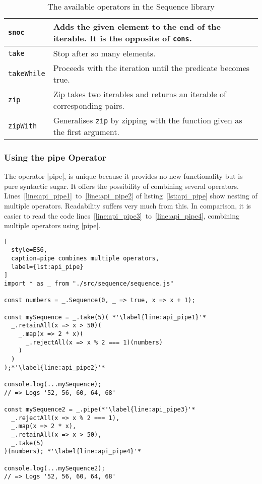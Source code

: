 \begin{table}[H]
\begin{tabularx}{\textwidth}{| l | X |}
    \texttt{snoc} & Adds the given element to the end of the iterable. It is the opposite of \texttt{cons}.\\ \hline 
    \texttt{take} & Stop after so many elements. \\ \hline 
    \texttt{takeWhile} & Proceeds with the iteration until the predicate becomes true. \\ \hline 
    \texttt{zip} & Zip takes two iterables and returns an iterable of corresponding pairs. \\ \hline 
    \texttt{zipWith} & Generalises \texttt{zip} by zipping with the function given as the first argument. \\ \hline 
  \end{tabularx}
  \caption{The available operators in the Sequence library}
  \label{tab:api_operators}
\end{table}

\subsubsection{Using the pipe Operator} %
\label{subsub:Using the pipe Operator}
The operator |pipe|, is unique because it provides no new functionality but is
pure syntactic sugar. It offers the possibility of combining several operators.
Lines~\ref{line:api_pipe1}~to~\ref{line:api_pipe2} of listing~\ref{lst:api_pipe}
show nesting of multiple operators. Readability suffers very much from this.
In comparison, it is easier to read the code
lines~\ref{line:api_pipe3}~to~\ref{line:api_pipe4}, combining multiple operators
using |pipe|. 
\begin{lstlisting}[
  style=ES6,
  caption=pipe combines multiple operators,
  label={lst:api_pipe}
]
import * as _ from "./src/sequence/sequence.js"

const numbers = _.Sequence(0, _ => true, x => x + 1);

const mySequence = _.take(5)( *'\label{line:api_pipe1}'*
  _.retainAll(x => x > 50)(
    _.map(x => 2 * x)(
      _.rejectAll(x => x % 2 === 1)(numbers)
    )
  )
);*'\label{line:api_pipe2}'*

console.log(...mySequence);
// => Logs '52, 56, 60, 64, 68'

const mySequence2 = _.pipe(*'\label{line:api_pipe3}'*
  _.rejectAll(x => x % 2 === 1),
  _.map(x => 2 * x),
  _.retainAll(x => x > 50),
  _.take(5)
)(numbers); *'\label{line:api_pipe4}'*

console.log(...mySequence2);
// => Logs '52, 56, 60, 64, 68'
\end{lstlisting}

